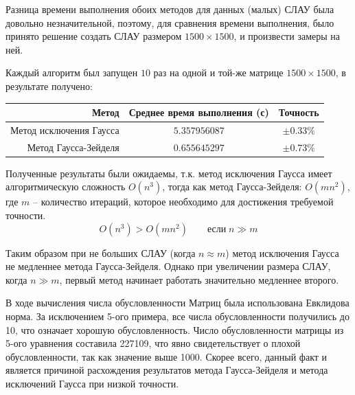 \documentclass[a4paper]{article}
\begin{document}
\bigskip

Разница времени выполнения обоих методов для данных (малых) СЛАУ была довольно незначительной, поэтому, для сравнения времени выполнения, было принято решение создать СЛАУ размером $1500 \times 1500$, и произвести замеры на ней.

Каждый алгоритм был запущен $10$ раз на одной и той-же матрице $1500 \times 1500$, в результате получено:
\begin{center}
    \begin{tabular}{r|cc}
        Метод & Среднее время выполнения (с) & Точность \\
        \hline
        Метод исключения Гаусса & $5.357956087$ & $\pm 0.33\%$ \\
        Метод Гаусса-Зейделя    & $0.655645297$ & $\pm 0.73\%$ \\
    \end{tabular}
\end{center}

Полученные результаты были ожидаемы, т.к. метод исключения Гаусса имеет алгоритмическую сложность $O(n^3)$, тогда как метод Гаусса-Зейделя: $O(mn^2)$, где $m$ -- количество итераций, которое необходимо для достижения требуемой точности.
\begin{equation*}
    O(n^3) > O(mn^2) \qquad \text{если} \; n \gg m
\end{equation*}

Таким образом при не больших СЛАУ (когда $n \approx m$) метод исключения Гаусса не медленнее метода Гаусса-Зейделя. Однако при увеличении размера СЛАУ, когда $n \gg m$, первый метод начинает работать значительно медленнее второго.

\bigskip

В ходе вычисления числа обусловленности Матриц была использована Евклидова норма. За исключением 5-ого примера, все числа обусловленности получились до 10, что означает хорошую обусловленность.
Число обусловленности матрицы из 5-ого уравнения составила 227109, что явно свидетельствует о плохой обусловленности, так как значение выше 1000. Скорее всего, данный факт и является причиной расхождения результатов метода Гаусса-Зейделя и метода исключений Гаусса при низкой точности.
\end{document}
